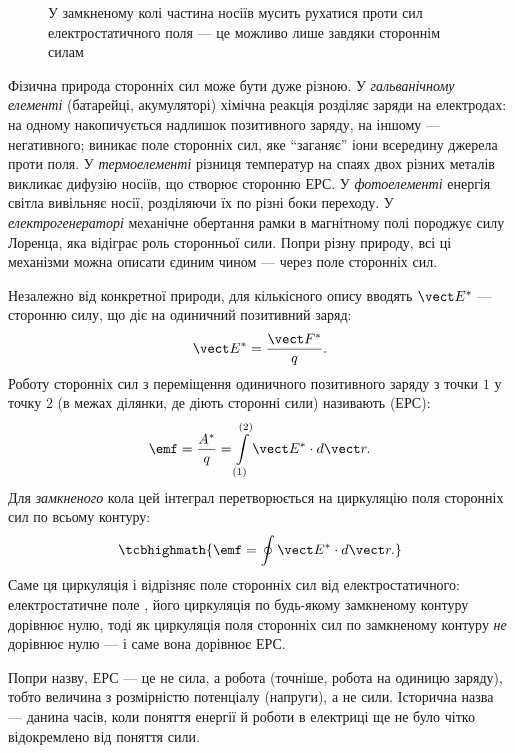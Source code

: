 \begin{figure}\centering
	\caption{У замкненому колі частина носіїв мусить рухатися проти сил електростатичного поля --- це
		можливо лише завдяки стороннім силам\label{pic:CurrentSpheres}}
\end{figure}

Фізична природа сторонніх сил може бути дуже різною. У \emph{гальванічному елементі} (батарейці, акумуляторі) хімічна реакція
розділяє заряди на електродах: на одному накопичується надлишок позитивного заряду, на іншому --- негативного; виникає поле
сторонніх сил, яке \enquote{заганяє} іони всередину джерела проти поля. У \emph{термоелементі} різниця температур на спаях двох різних
металів викликає дифузію носіїв, що створює сторонню ЕРС. У \emph{фотоелементі} енергія світла вивільняє носії, розділяючи їх по
різні боки переходу. У \emph{електрогенераторі} механічне обертання рамки в магнітному полі породжує силу Лоренца, яка відіграє
роль сторонньої сили. Попри різну природу, всі ці механізми можна описати єдиним чином --- через поле сторонніх сил.

Незалежно від конкретної природи, для кількісного опису вводять  $\vect E^*$ --- сторонню силу, що діє на
одиничний позитивний заряд:
\begin{equation}\label{eq:ExtraneousForceField}
	\vect E^* = \frac{\vect F^*}{q}.
\end{equation}
Роботу сторонніх сил з переміщення одиничного позитивного заряду з точки $1$ у точку $2$ (в межах ділянки, де діють сторонні сили)
називають  (ЕРС):
\begin{equation}\label{eq:EMFDef}
		\emf = \frac{A^*}{q} = \int\limits_{(1)}^{(2)} \vect E^* \cdot d\vect r.
\end{equation}
Для \emph{замкненого} кола цей інтеграл перетворюється на циркуляцію поля сторонніх сил по всьому контуру:
\begin{equation}\label{eq:EMFClosedLoop}
	\tcbhighmath{
		\emf = \oint \vect E^* \cdot d\vect r.
	}
\end{equation}
Саме ця циркуляція і відрізняє поле сторонніх сил від електростатичного: електростатичне поле , його циркуляція
по будь-якому замкненому контуру дорівнює нулю, тоді як циркуляція поля сторонніх сил по замкненому контуру \emph{не} дорівнює
нулю --- і саме вона дорівнює ЕРС.

\begin{Attention}
	Попри назву, ЕРС --- це не сила, а робота (точніше, робота на одиницю заряду), тобто величина з розмірністю потенціалу
	(напруги), а не сили. Історична назва --- данина часів, коли поняття енергії й роботи в електриці ще не було чітко відокремлено
	від поняття сили.
\end{Attention}

